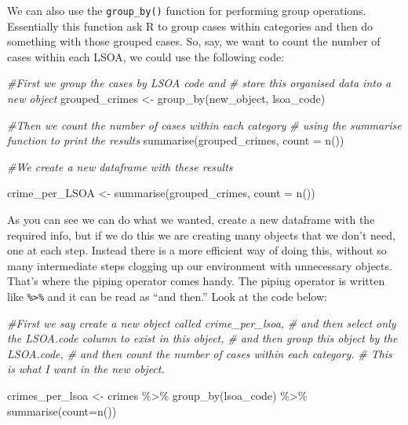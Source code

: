 \documentclass[
]{book}
\makeatletter
\newenvironment{Shaded}{\begin{snugshade}}{\end{snugshade}}
\newcommand{\AttributeTok}[1]{\textcolor[rgb]{0.61,0.61,0.61}{#1}}
\newcommand{\CommentTok}[1]{\textcolor[rgb]{0.37,0.37,0.37}{\textit{#1}}}
\newcommand{\FunctionTok}[1]{\textcolor[rgb]{0,0,0}{#1}}
\newcommand{\NormalTok}[1]{#1}
\newcommand{\OtherTok}[1]{\textcolor[rgb]{0.37,0.37,0.37}{#1}}
\newcommand{\SpecialCharTok}[1]{\textcolor[rgb]{0,0,0}{#1}}
\newenvironment{kframe}{%
\medskip{}
\setlength{\fboxsep}{.8em}
 \def\at@end@of@kframe{}%
 \ifinner\ifhmode%
  \def\at@end@of@kframe{\end{minipage}}%
  \begin{minipage}{\columnwidth}%
 \fi\fi%
 \def\FrameCommand##1{\hskip\@totalleftmargin \hskip-\fboxsep
 \colorbox{shadecolor}{##1}\hskip-\fboxsep
     \hskip-\linewidth \hskip-\@totalleftmargin \hskip\columnwidth}%
 \MakeFramed {\advance\hsize-\width
   \@totalleftmargin\z@ \linewidth\hsize
   \@setminipage}}%
 {\par\unskip\endMakeFramed%
 \at@end@of@kframe}
\renewenvironment{Shaded}{\begin{kframe}}{\end{kframe}}
\makeatother
\begin{document}
We can also use the \texttt{group\_by()} function for performing group operations. Essentially this function ask R to group cases within categories and then do something with those grouped cases. So, say, we want to count the number of cases within each LSOA, we could use the following code:

\begin{Shaded}
\begin{Highlighting}[]
\CommentTok{\#First we group the cases by LSOA code and }
\CommentTok{\# store this organised data into a new object}
\NormalTok{grouped\_crimes }\OtherTok{\textless{}{-}} \FunctionTok{group\_by}\NormalTok{(new\_object, lsoa\_code)}

\CommentTok{\#Then we count the number of cases within each category }
\CommentTok{\# using the summarise function to print the results}
\FunctionTok{summarise}\NormalTok{(grouped\_crimes, }\AttributeTok{count =} \FunctionTok{n}\NormalTok{())}

\CommentTok{\#We create a new dataframe with these results}

\NormalTok{crime\_per\_LSOA }\OtherTok{\textless{}{-}} \FunctionTok{summarise}\NormalTok{(grouped\_crimes, }\AttributeTok{count =} \FunctionTok{n}\NormalTok{())}
\end{Highlighting}
\end{Shaded}

As you can see we can do what we wanted, create a new dataframe with the required info, but if we do this we are creating many objects that we don't need, one at each step. Instead there is a more efficient way of doing this, without so many intermediate steps clogging up our environment with unnecessary objects. That's where the piping operator comes handy. The piping operator is written like \texttt{\%\textgreater{}\%} and it can be read as ``and then.'' Look at the code below:

\begin{Shaded}
\begin{Highlighting}[]
\CommentTok{\#First we say create a new object called crime\_per\_lsoa, }
\CommentTok{\# and then select only the LSOA.code column to exist in this object, }
\CommentTok{\# and then group this object by the LSOA.code, }
\CommentTok{\# and then count the number of cases within each category. }
\CommentTok{\# This is what I want in the new object.}

\NormalTok{crimes\_per\_lsoa }\OtherTok{\textless{}{-}}\NormalTok{ crimes }\SpecialCharTok{\%\textgreater{}\%}
  \FunctionTok{group\_by}\NormalTok{(lsoa\_code) }\SpecialCharTok{\%\textgreater{}\%}
  \FunctionTok{summarise}\NormalTok{(}\AttributeTok{count=}\FunctionTok{n}\NormalTok{())}
\end{Highlighting}
\end{Shaded}
\end{document}
